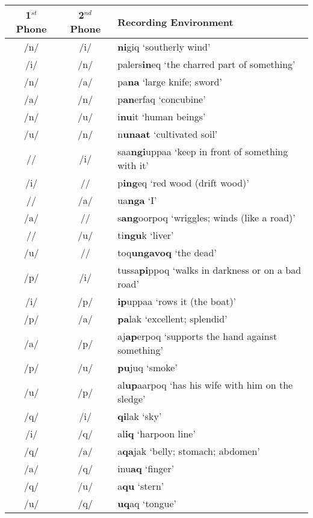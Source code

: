 \documentclass[12pt]{article}
\begin{document}
	\newpage
	\begin{tabular}{|c|c|l|}
	\hline
	1$^{st}$ Phone & 2$^{nd}$ Phone & Recording Environment \\
	\hline
	/n/ & /i/ & \textbf{ni}giq `southerly wind' \\
	/i/ & /n/ & palers\textbf{in}eq `the charred part of something'\\
	/n/ & /a/ & pa\textbf{na} `large knife; sword'\\
	/a/ & /n/ & p\textbf{an}erfaq `concubine'\\
	/n/ & /u/ & i\textbf{nu}it `human beings'\\
	/u/ & /n/ & n\textbf{unaat} `cultivated soil'\\
	/\textipa{N}/ & /i/ & saa\textbf{ngi}uppaa `keep in front of something with it'\\
	/i/ & /\textipa{N}/ & p\textbf{ing}eq `red wood (drift wood)'\\
	/\textipa{N}/ & /a/ & ua\textbf{nga} `I' \\
	/a/ & /\textipa{N}/ & s\textbf{ang}oorpoq `wriggles; winds (like a road)'\\
	/\textipa{N}/ & /u/ & ti\textbf{ngu}k `liver'\\
	/u/ & /\textipa{N}/ & toq\textbf{ungavoq} `the dead'\\
	/p/ & /i/ & tussa\textbf{pi}ppoq `walks in darkness or on a bad road'\\
	/i/ & /p/ & \textbf{ip}uppaa `rows it (the boat)'\\
	/p/ & /a/ & \textbf{pa}lak `excellent; splendid'\\
	/a/ & /p/ & aj\textbf{ap}erpoq `supports the hand against something'\\
	/p/ & /u/ & \textbf{pu}juq `smoke' \\
	/u/ & /p/ & al\textbf{up}aarpoq `has his wife with him on the sledge'\\
	/q/ & /i/ & \textbf{qi}lak `sky' \\
	/i/ & /q/ & al\textbf{iq} `harpoon line' \\
	/q/ & /a/ & a\textbf{qa}jak `belly; stomach; abdomen'\\
	/a/ & /q/ & inu\textbf{aq} `finger' \\
	/q/ & /u/ & a\textbf{qu} `stern'\\
	/u/ & /q/ & \textbf{uq}aq `tongue' \\
	\hline
	\end{tabular}
	\newpage
\end{document}
